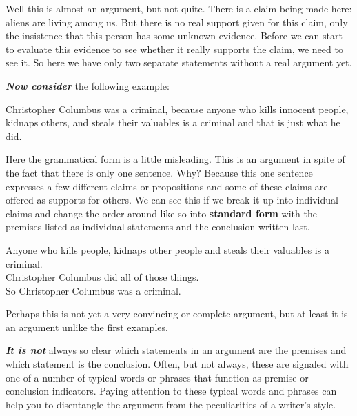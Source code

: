 \documentclass[12pt, openany]{book}
\begin{document}
Well this is almost an argument, but not quite. There is a claim being made here: aliens are living among us. But there is no real support given for this claim, only the insistence that this person has some unknown evidence. Before we can start to evaluate this evidence to see whether it really supports the claim, we need to see it. So here we have only two separate statements without a real argument yet.

\textbf{\emph{Now consider}} the following example:

\begin{center}

\begin{argument}

Christopher Columbus was a criminal, because anyone who kills innocent people, kidnaps others, and steals their valuables is a criminal and that is just what he did.

\end{argument}

\end{center}

Here the grammatical form is a little misleading. This is an argument in spite of the fact that there is only one sentence. Why? Because this one sentence expresses a few different claims or propositions and some of these claims are offered as supports for others. We can see this if we break it up into individual claims and change the order around like so into \textbf{standard form} with the premises listed as individual statements and the conclusion written last.

\begin{center}

\begin{argument}

Anyone who kills people, kidnaps other people and steals their valuables is a criminal.\\
Christopher Columbus did all of those things.\\

So Christopher Columbus was a criminal.

\end{argument}

\end{center}

Perhaps this is not yet a very convincing or complete argument, but at least it is an argument unlike the first examples.

\textbf{\emph{It is not}} always so clear which statements in an argument are the premises and which statement is the conclusion. Often, but not always, these are signaled with one of a number of typical words or phrases that function as premise or conclusion indicators. Paying attention to these typical words and phrases can help you to disentangle the argument from the peculiarities of a writer's style.
\end{document}
